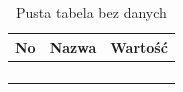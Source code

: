 \begin{table}[!ht]
    \caption{Pusta tabela bez danych}
    \label{tab:emptyTable}
    \begin{tabular}{ccc}
        \hline
        \textbf{No} & \textbf{Nazwa} & \textbf{Wartość} \\ \hline\hline
                    &                &                  \\ 
                    &                &                  \\ 
                    &                &                  \\
                    &                &                  \\ \hline   
    \end{tabular}
\end{table}